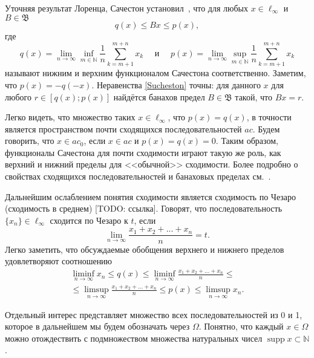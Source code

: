 \documentclass[a4paper,openbib]{article}
\renewcommand{\leq}{\leqslant}
\DeclareMathOperator{\supp}{supp}
\theoremstyle{definition}
\begin{document}
Уточняя результат Лоренца, Сачестон установил~\cite{sucheston1967banach}, что
для любых $x\in \ell_\infty$ и $B\in\mathfrak{B}$
\begin{equation}\label{Sucheston}
	q(x) \leqslant Bx \leqslant p(x)
	,
\end{equation}
где
\begin{equation*}
	q(x) = \lim_{n\to\infty} \inf_{m\in\mathbb{N}}  \frac{1}{n} \sum_{k=m+1}^{m+n} x_k
	\mbox{~~~~и~~~~}
	p(x) = \lim_{n\to\infty} \sup_{m\in\mathbb{N}}  \frac{1}{n} \sum_{k=m+1}^{m+n} x_k
\end{equation*}
называют нижним и верхним функционалом Сачестона соответственно.
Заметим, что $p(x) = -q(-x)$.
Неравенства \eqref{Sucheston} точны:
для данного $x$ для любого $r\in[q(x); p(x)]$ найдётся банахов предел
$B\in\mathfrak{B}$ такой, что $Bx = r$.

Легко видеть, что множество таких $x\in\ell_\infty$, что $p(x)=q(x)$,
в точности является пространством почти сходящихся последовательностей $ac$.
Будем говорить, что $x\in ac_0$, если $x\in ac$ и $p(x)=q(x)=0$.
Таким образом, функционалы Сачестона для почти сходимости играют такую же роль,
как верхний и нижний пределы для <<обычной>> сходимости.
Более подробно о свойствах сходящихся последовательностей и банаховых пределах см.~\cite{semenov2020geomBL}.

Дальнейшим ослаблением понятия сходимости является сходимость по Чезаро (сходимость в среднем) [TODO: ссылка].
Говорят, что последовательность $\{x_n\}\in\ell_\infty$ сходится по Чезаро к $t$, если
\begin{equation}
	\lim_{n\to\infty}\frac{x_1+x_2+...+x_n}{n} = t
	.
\end{equation}
Легко заметить, что обсуждаемые обобщения верхнего и нижнего пределов удовлетворяют соотношению
\begin{multline}
	\liminf_{n\to\infty} x_n \leq q(x) \leq \liminf_{n\to\infty}\frac{x_1+x_2+...+x_n}{n}
	\leq
	\\ \leq
	\limsup_{n\to\infty}\frac{x_1+x_2+...+x_n}{n}
	\leq p(x)
	\leq \limsup_{n\to\infty} x_n
	.
\end{multline}

Отдельный интерес представляет множество всех последовательностей из 0 и 1,
которое в дальнейшем мы будем обозначать через $\Omega$.
Понятно, что каждый $x\in \Omega$ можно отождествить с подмножеством множества натуральных чисел
$\supp x \subset \mathbb{N}$.
\end{document}
